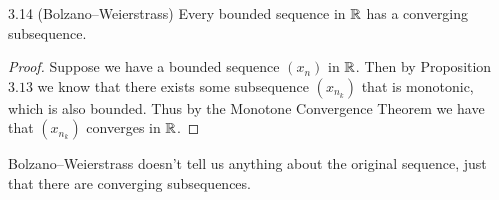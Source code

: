 \documentclass[class=article, crop=false]{standalone}
\begin{document}
  \begin{theorem}{3.14 (Bolzano--Weierstrass)}
    Every bounded sequence in $\mathbb{R}$ has a converging subsequence.
    \begin{proof}
      Suppose we have a bounded sequence $(x_n)$ in $\mathbb{R}$. Then by Proposition $3.13$ we know that there exists some subsequence $(x_{n_k})$ that is monotonic, which is also bounded. Thus by the Monotone Convergence Theorem we have that $(x_{n_k})$ converges in $\mathbb{R}$.
    \end{proof}
  \end{theorem}
  \begin{note}{}
    Bolzano--Weierstrass doesn't tell us anything about the original sequence, just that there are converging subsequences.
  \end{note}
\end{document}
